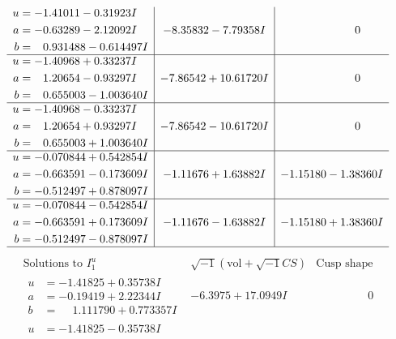 \documentclass[1p]{elsarticle_modified}
\theoremstyle{definition}
\newcommand{\I}{\sqrt{-1}}
\begin{document}
$$\begin{array}{c|c|c}
\begin{aligned}
u &= -1.41011 - 0.31923 I \\
a &= -0.63289 - 2.12092 I \\
b &= \phantom{-}0.931488 - 0.614497 I\end{aligned}
 & -8.35832 - 7.79358 I & \phantom{-0.000000 } 0 \\ \hline\begin{aligned}
u &= -1.40968 + 0.33237 I \\
a &= \phantom{-}1.20654 - 0.93297 I \\
b &= \phantom{-}0.655003 - 1.003640 I\end{aligned}
 & -7.86542 + 10.61720 I & \phantom{-0.000000 } 0 \\ \hline\begin{aligned}
u &= -1.40968 - 0.33237 I \\
a &= \phantom{-}1.20654 + 0.93297 I \\
b &= \phantom{-}0.655003 + 1.003640 I\end{aligned}
 & -7.86542 - 10.61720 I & \phantom{-0.000000 } 0 \\ \hline\begin{aligned}
u &= -0.070844 + 0.542854 I \\
a &= -0.663591 - 0.173609 I \\
b &= -0.512497 + 0.878097 I\end{aligned}
 & -1.11676 + 1.63882 I & -1.15180 - 1.38360 I \\ \hline\begin{aligned}
u &= -0.070844 - 0.542854 I \\
a &= -0.663591 + 0.173609 I \\
b &= -0.512497 - 0.878097 I\end{aligned}
 & -1.11676 - 1.63882 I & -1.15180 + 1.38360 I\\
 \hline 
 \end{array}$$\newpage$$\begin{array}{c|c|c}  
\text{Solutions to }I^u_{1}& \I (\text{vol} + \sqrt{-1}CS) & \text{Cusp shape}\\
 \hline 
\begin{aligned}
u &= -1.41825 + 0.35738 I \\
a &= -0.19419 + 2.22344 I \\
b &= \phantom{-}1.111790 + 0.773357 I\end{aligned}
 & -6.3975 + 17.0949 I & \phantom{-0.000000 } 0 \\ \hline\begin{aligned}
u &= -1.41825 - 0.35738 I \\

\end{aligned}
\end{array}$$
\end{document}
